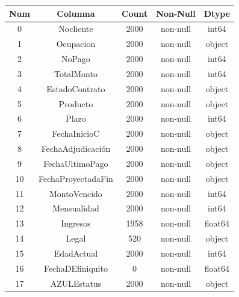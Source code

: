 \begin{table}[H]
    \centering
    \begin{tabular}{|c|c|c|c|c|}
        \hline
        \rowcolor{softblue} %
        \textbf{Num} & \textbf{Columna} & \textbf{Count} & \textbf{Non-Null} & \textbf{Dtype} \\
        \hline
        \hline
        0 &	Nocliente &		2000 &	non-null &	int64  \\
        \hline
        1 &	Ocupacion &		2000 &	non-null &	object \\
        \hline
        2 &  NoPago    &          2000 & non-null &  int64  \\
        \hline
        3 &  TotalMonto  &        2000 & non-null &  int64  \\
        \hline
        4 &  EstadoContrato &     2000 & non-null &  object \\
        \hline
        5 &   Producto  &         2000 & non-null &   object \\
        \hline
        6 &  Plazo     &          2000 & non-null &   int64  \\
        \hline
        7 &  FechaInicioC  &      2000 & non-null &   object \\
        \hline
        8 &  FechaAdjudicación &   2000 & non-null &   object \\
        \hline
        9 &   FechaUltimoPago &     2000 & non-null &   object \\
        \hline
        10 &  FechaProyectadaFin &  2000 & non-null &   object \\
        \hline
        11 &  MontoVencido &        2000 & non-null &   int64  \\
        \hline
        12 &  Mensualidad &         2000 & non-null &   int64  \\
        \hline
        \rowcolor{mediumgray}
        13 &  Ingresos &            1958 & non-null &   float64 \\
        \hline
        \rowcolor{mediumgray}
        14 &  Legal &               520 & non-null &    object \\
        \hline
        15 &  EdadActual &          2000 & non-null &   int64  \\
        \hline
        \rowcolor{mediumgray}
        16 &  FechaDEfiniquito &    0 & non-null &      float64 \\
        \hline
        17 &  AZULEstatus &         2000 & non-null &   object \\

\end{tabular}
\end{table}
